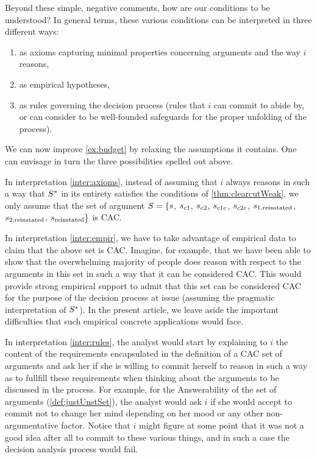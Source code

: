 \documentclass[smallextended,nospthms, natbib]{svjour3}
\begin{document}
Beyond these simple, negative comments, how are our conditions to be understood? In general terms, these various conditions can be interpreted in three different ways:
\begin{enumerate}[label=({\roman*})]
	\item \label{inter:axioms} as axioms capturing minimal properties concerning arguments and the way $i$ reasons,
	\item \label{inter:empir} as empirical hypotheses,
	\item \label{inter:rules} as rules governing the decision process (rules that $i$ can commit to abide by, or can consider to be well-founded safeguards for the proper unfolding of the process).
\end{enumerate}

\begin{example}
\label{ex:budgetInterpr}
We can now improve \cref{ex:budget} by relaxing the assumptions it contains. One can envisage in turn the three possibilities spelled out above.

In interpretation \ref{inter:axioms}, instead of assuming that $i$ always reasons in such a way that $S^*$ in its entirety satisfies the conditions of \cref{thm:clearcutWeak}, we only assume that the set of argument $S = \{s$, $s_{c1}$, $s_{c2}$, $s_{c1c}$, $s_{c2c}$, $s_{1, \text{reinstated}}$, $s_{2, \text{reinstated}}$, $s_\text{reinstated}\}$ is CAC.

In interpretation \ref{inter:empir}, we have to take advantage of empirical data to claim that the above set is CAC. Imagine, for example, that we have been able to show that the overwhelming majority of people does reason with respect to the arguments in this set in such a way that it can be considered CAC. This would provide strong empirical support to admit that this set can be considered CAC for the purpose of the decision process at issue (assuming the pragmatic interpretation of $S^*$). In the present article, we leave aside the important difficulties that such empirical concrete applications would face.

In interpretation \ref{inter:rules}, the analyst would start by explaining to $i$ the content of the requirements encapsulated in the definition of a CAC set of arguments and ask her if she is willing to commit herself to reason in such a way as to fullfill these requirements when thinking about the arguments to be discussed in the process. For example, for the Answerability of the set of arguments (\cref{def:justUnstSet}), the analyst would ask $i$ if she would accept to commit not to change her mind depending on her mood or any other non-argumentative factor. Notice that $i$ might figure at some point that it was not a good idea after all to commit to these various things, and in such a case the decision analysis process would fail.
\end{example}
\end{document}
